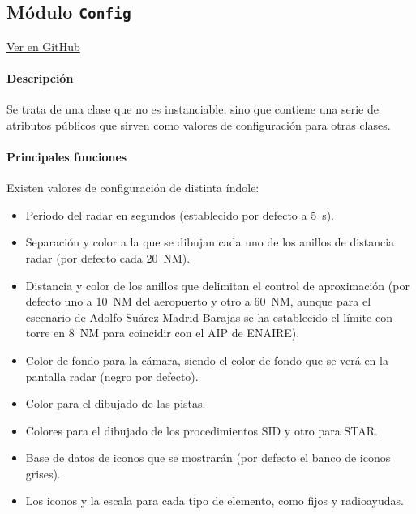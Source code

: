 \subsection{Módulo \texttt{Config}}
\label{subsec:ClaseConfig}

\vspace{-0.85cm}
\begin{flushright}
\href{https://github.com/macgyver912/atc-simulator/blob/jaime/Assets/Scripts/game/Config.cs}{Ver en GitHub \faGithub}
\end{flushright}

\paragraph{Descripción} \phantom{\newline}

Se trata de una clase que no es instanciable, sino que contiene una serie de atributos públicos que sirven como valores de configuración para otras clases.

\paragraph{Principales funciones} \phantom{\newline}

Existen valores de configuración de distinta índole: 

\begin{itemize}
\item Periodo del radar en segundos (establecido por defecto a \SI{5}{s}).
\item Separación y color a la que se dibujan cada uno de los anillos de distancia radar (por defecto cada \SI{20}{NM}).
\item Distancia y color de los anillos que delimitan el control de aproximación (por defecto uno a \SI{10}{NM} del aeropuerto y otro a \SI{60}{NM}, aunque para el escenario de Adolfo Suárez Madrid-Barajas se ha establecido el límite con torre en \SI{8}{NM} para coincidir con el AIP de ENAIRE).
\item Color de fondo para la cámara, siendo el color de fondo que se verá en la pantalla radar (negro por defecto).
\item Color para el dibujado de las pistas.
\item Colores para el dibujado de los procedimientos SID y otro para STAR.
\item Base de datos de iconos que se mostrarán (por defecto el banco de iconos grises).
\item Los iconos y la escala para cada tipo de elemento, como fijos y radioayudas.
\end{itemize}






